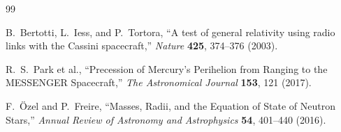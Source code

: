 \documentclass[12pt]{article}
\begin{document}
\begin{thebibliography}{99}

B.~Bertotti, L.~Iess, and P.~Tortora,
``A test of general relativity using radio links with the Cassini
spacecraft,''
\textit{Nature} \textbf{425}, 374--376 (2003).


R.~S.~Park et al.,
``Precession of Mercury's Perihelion from Ranging to the MESSENGER
Spacecraft,''
\textit{The Astronomical Journal} \textbf{153}, 121 (2017).


F.~\"Ozel and P.~Freire,
``Masses, Radii, and the Equation of State of Neutron Stars,''
\textit{Annual Review of Astronomy and Astrophysics}
\textbf{54}, 401--440 (2016).

\end{thebibliography}
\end{document}
